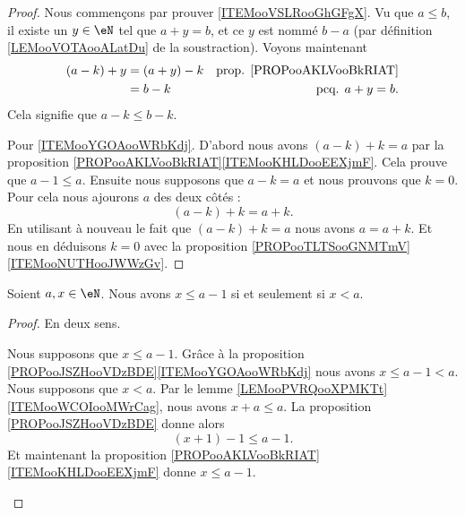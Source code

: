 \begin{proof}
	Nous commençons par prouver \ref{ITEMooVSLRooGhGFgX}. Vu que \( a\leq b\), il existe un \( y\in \eN\) tel que \( a+y=b\), et ce \( y\) est nommé \( b-a\) (par définition \ref{LEMooVOTAooALatDu} de la soustraction). Voyons maintenant
	\begin{subequations}
		\begin{align}
			(a-k)+y & =(a+y)-k & \text{prop. \ref{PROPooAKLVooBkRIAT}} \\
			        & =b-k     & \text{pcq. \( a+y=b\)}.
		\end{align}
	\end{subequations}
	Cela signifie que \( a-k\leq b-k\).

	Pour \ref{ITEMooYGOAooWRbKdj}. D'abord nous avons \((a-k)+k=a \) par la proposition \ref{PROPooAKLVooBkRIAT}\ref{ITEMooKHLDooEEXjmF}. Cela prouve que \( a-1\leq a\). Ensuite nous supposons que \( a-k=a\) et nous prouvons que \( k=0\). Pour cela nous ajourons \( a\) des deux côtés :
	\begin{equation}
		(a-k)+k=a+k.
	\end{equation}
	En utilisant à nouveau le fait que \( (a-k)+k=a\) nous avons \( a=a+k\). Et nous en déduisons \( k=0\) avec la proposition \ref{PROPooTLTSooGNMTmV}\ref{ITEMooNUTHooJWWzGv}.
\end{proof}

\begin{proposition}	\label{PROPooHRCOooBkEvud}
	Soient \( a,x\in \eN\). Nous avons \( x\leq a-1\) si et seulement si \( x<a\).
\end{proposition}

\begin{proof}
	En deux sens.
	\begin{subproof}
		\spitem[\( \Rightarrow\)]
		Nous supposons que \( x\leq a-1\). Grâce à la proposition \ref{PROPooJSZHooVDzBDE}\ref{ITEMooYGOAooWRbKdj} nous avons \( x\leq a-1<a\).
		\spitem[\( \Leftarrow\)]
		Nous supposons que \( x<a\). Par le lemme \ref{LEMooPVRQooXPMKTt}\ref{ITEMooWCOIooMWrCag}, nous avons \( x+a\leq a\). La proposition \ref{PROPooJSZHooVDzBDE} donne alors
		\begin{equation}
			(x+1)-1\leq a-1.
		\end{equation}
		Et maintenant la proposition \ref{PROPooAKLVooBkRIAT}\ref{ITEMooKHLDooEEXjmF} donne \( x\leq a-1\).
	\end{subproof}
\end{proof}

